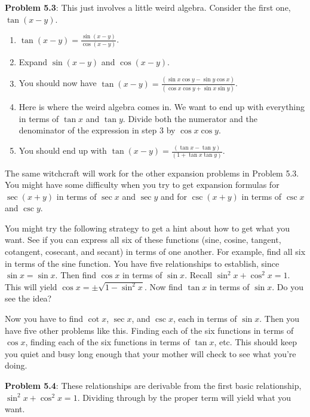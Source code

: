 \documentclass[english]{book}
\begin{document}
\textbf{Problem 5.3}: This just involves a little weird algebra. Consider the first one, $\tan (x-y)$.
\begin{enumerate}[\hspace{1cm}1)]
  \item $\tan (x-y) = \frac{\sin (x-y)}{\cos (x-y)}$.
  \item Expand $\sin (x-y)$ and $\cos (x-y)$.
  \item You should now have $\tan (x-y) = \frac{(\sin x \cos y - \sin y \cos x)}{(\cos x \cos y + \sin x \sin y)}$.
  \item Here is where the weird algebra comes in. We want to end up with everything in terms of $\tan x$ and $\tan y$. Divide both the numerator and the denominator of the expression in step 3 by $\cos x\cos y$.
  \item You should end up with $\tan (x-y)= \frac{(\tan x - \tan y)}{(1 + \tan x \tan y)}$. 
\end{enumerate}
The same witchcraft will work for the other expansion problems in Problem 5.3. You might have some difficulty when you try to get expansion formulas for $\sec (x+y)$ in terms of $\sec x$ and $\sec y$ and for $\csc(x+y)$ in terms of $\csc x$ and $\csc y$. 

You might try the following strategy to get a hint about how to get what you want. See if you can express all six of these functions (sine, cosine, tangent, cotangent, cosecant, and secant) in terms of one another. For example, find all six in terms of the sine function. You have five relationships to establish, since $\sin x = \sin x$. Then find $\cos x$ in terms of $\sin x$. Recall $\sin^{2} x + \cos^{2} x = 1$. This will yield $\cos x = \pm \sqrt{1 - \sin^{2} x}$. Now find $\tan x$ in terms of $\sin x$. Do you see the idea? 

Now you have to find $\cot x$, $\sec x$, and $\csc x$, each in terms of $\sin x$. Then you have five other problems like this. Finding each of the six functions in terms of $\cos x$, finding each of the six functions in terms of $\tan x$, etc. This should keep you quiet and busy long enough that your mother will check to see what you're doing.

\vspace{0.3cm}

\textbf{Problem 5.4}: These relationships are derivable from the first basic relationship, $\sin^{2} x + \cos^{2} x = 1$. Dividing through by the proper term will yield what you want.

\vspace{0.3cm}
\end{document}
